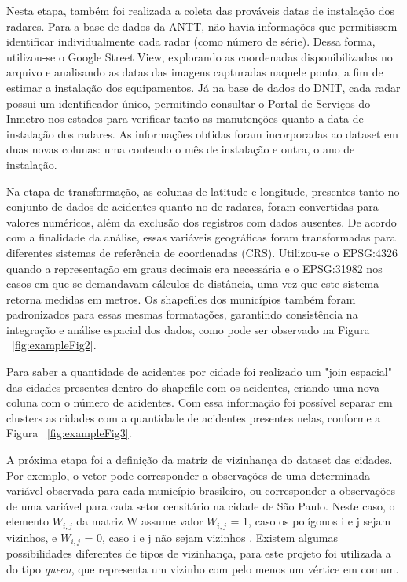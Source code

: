 \documentclass[12pt]{article}
\begin{document}
Nesta etapa, também foi realizada a coleta das prováveis datas de instalação dos radares. Para a base de dados da ANTT, não havia informações que permitissem identificar individualmente cada radar (como número de série). Dessa forma, utilizou-se o Google Street View, explorando as coordenadas disponibilizadas no arquivo e analisando as datas das imagens capturadas naquele ponto, a fim de estimar a instalação dos equipamentos. Já na base de dados do DNIT, cada radar possui um identificador único, permitindo consultar o Portal de Serviços do Inmetro nos estados para verificar tanto as manutenções quanto a data de instalação dos radares. As informações obtidas foram incorporadas ao dataset em duas novas colunas: uma contendo o mês de instalação e outra, o ano de instalação.

Na etapa de transformação, as colunas de latitude e longitude, presentes tanto no conjunto de dados de acidentes quanto no de radares, foram convertidas para valores numéricos, além da exclusão dos registros com dados ausentes. De acordo com a finalidade da análise, essas variáveis geográficas foram transformadas para diferentes sistemas de referência de coordenadas (CRS). Utilizou-se o EPSG:4326 quando a representação em graus decimais era necessária e o EPSG:31982 nos casos em que se demandavam cálculos de distância, uma vez que este sistema retorna medidas em metros. Os shapefiles dos municípios também foram padronizados para essas mesmas formatações, garantindo consistência na integração e análise espacial dos dados, como pode ser observado na Figura ~\ref{fig:exampleFig2}.

Para saber a quantidade de acidentes por cidade foi realizado um "join espacial" das cidades presentes dentro do shapefile com os acidentes, criando uma nova coluna com o número de acidentes. Com essa informação foi possível separar em clusters as cidades com a quantidade de acidentes presentes nelas, conforme a Figura ~\ref{fig:exampleFig3}.

A próxima etapa foi a definição da matriz de vizinhança do dataset das cidades. Por exemplo, o vetor pode corresponder a observações de uma determinada variável
observada para cada município brasileiro, ou corresponder a observações de uma
variável para cada setor censitário na cidade de São Paulo. Neste caso, o elemento $W_{i,j}$
da matriz W assume valor $W_{i,j}$ = 1, caso os polígonos i e j sejam vizinhos, e $W_{i,j}$ = 0,
caso i e j não sejam vizinhos \cite{carvalho2010}. Existem algumas possibilidades diferentes de tipos de vizinhança, para este projeto foi utilizada a do tipo \textit{queen}, que representa um vizinho com pelo menos um vértice em comum.
\end{document}
